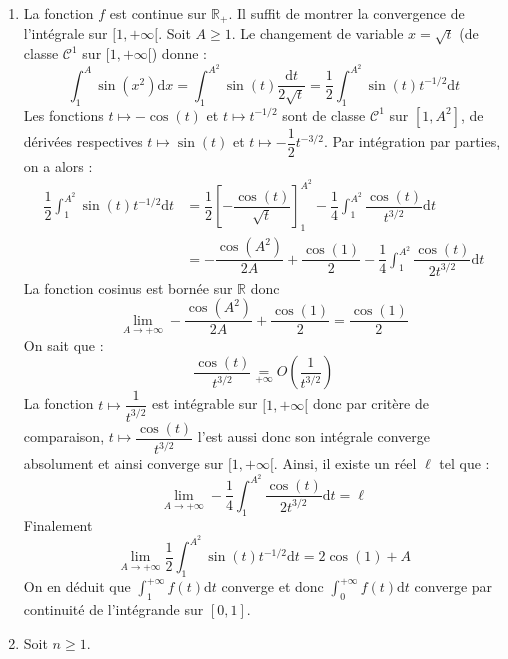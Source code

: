 \documentclass[a4paper,twoside,french,10pt]{VcCours}
\newcommand{\dx}{\text{d}x}
\newcommand{\dt}{\text{d}t}
\begin{document}
\begin{enumerate}
\item La fonction $f$ est continue sur $\mathbb{R}_+$. Il suffit de montrer la convergence de l'intégrale sur $[1, + \infty[$. Soit $A \geq 1$. Le changement de variable $x= \sqrt{t}$ (de classe $\mathcal{C}^1$ sur $[1, + \infty[$) donne :
$$ \int_1^A \sin(x^2) \dx = \int_1^{A^2} \sin(t) \dfrac{\dt}{2 \sqrt{t}} = \dfrac{1}{2} \int_1^{A^2} \sin(t) t^{-1/2} \dt$$
Les fonctions $t \mapsto - \cos(t)$ et $t \mapsto t^{-1/2}$ sont de classe $\mathcal{C}^1$ sur $[1, A^2]$, de dérivées respectives $t \mapsto \sin(t)$ et $t \mapsto - \dfrac{1}{2} t^{-3/2}$. Par intégration par parties, on a alors :
\begin{align*}
\dfrac{1}{2} \int_1^{A^2} \sin(t) t^{-1/2} \dt & = \dfrac{1}{2}\left[- \dfrac{\cos(t)}{\sqrt{t}} \right]_1^{A^2} - \dfrac{1}{4} \int_1^{A^2} \dfrac{\cos(t)}{t^{3/2}} \dt \\
& = - \dfrac{ \cos(A^2)}{2A} +\dfrac{\cos(1)}{2}   -  \dfrac{1}{4}\int_1^{A^2} \dfrac{\cos(t)}{2t^{3/2}} \dt 
\end{align*}
La fonction cosinus est bornée sur $\mathbb{R}$ donc 
$$ \lim_{A \rightarrow + \infty}  - \dfrac{ \cos(A^2)}{2A} +\dfrac{\cos(1)}{2} =  \dfrac{\cos(1)}{2}$$
On sait que :
$$ \dfrac{\cos(t)}{t^{3/2}} \underset{+\infty}{=} O \left( \dfrac{1}{t^{3/2}} \right)$$
La fonction $t \mapsto  \dfrac{1}{t^{3/2}}$ est intégrable sur $[1, + \infty[$ donc par critère de comparaison, $t \mapsto \dfrac{\cos(t)}{t^{3/2}}$ l'est aussi donc son intégrale converge absolument et ainsi converge sur $[1, + \infty[$. Ainsi, il existe un réel $\ell$ tel que :
$$ \lim_{A \rightarrow + \infty} -\dfrac{1}{4} \int_1^{A^2} \dfrac{\cos(t)}{2t^{3/2}} \dt  = \ell$$
Finalement 
$$ \lim_{A \rightarrow + \infty} \dfrac{1}{2} \int_1^{A^2} \sin(t) t^{-1/2} \dt = 2 \cos(1) + A$$
On en déduit que $\int_{1}^{+ \infty}  f(t) \dt$ converge et donc $\int_{0}^{+ \infty}  f(t) \dt$ converge par continuité de l'intégrande sur $[0,1]$.
\item Soit $n \geq 1$.


\end{enumerate}
\end{document}
